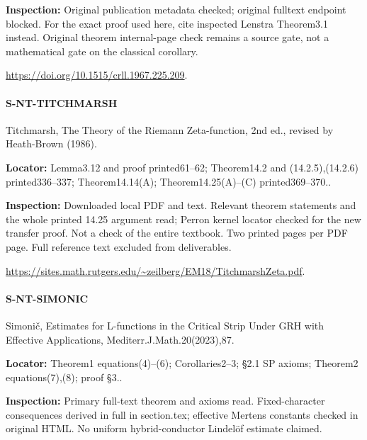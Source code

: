 \documentclass[11pt,a4paper]{article}
\begin{document}
\textbf{Inspection:} Original publication metadata checked; original fulltext endpoint blocked.\allowbreak{} For the exact proof used here, cite inspected Lenstra Theorem3.\allowbreak{}1 instead.\allowbreak{} Original theorem internal-page check remains a source gate, not a mathematical gate on the classical corollary.\allowbreak{}

\url{https://doi.org/10.1515/crll.1967.225.209}.

\paragraph{S-NT-TITCHMARSH} Titchmarsh, The Theory of the Riemann Zeta-function, 2nd ed.\allowbreak{}, revised by Heath-Brown (1986).

\textbf{Locator:} Lemma3.\allowbreak{}12 and proof printed61–\allowbreak{}62; Theorem14.\allowbreak{}2 and (14.\allowbreak{}2.\allowbreak{}5),(14.\allowbreak{}2.\allowbreak{}6) printed336–\allowbreak{}337; Theorem14.\allowbreak{}14(A); Theorem14.\allowbreak{}25(A)–\allowbreak{}(C) printed369–\allowbreak{}370.\allowbreak{}.

\textbf{Inspection:} Downloaded local PDF and text.\allowbreak{} Relevant theorem statements and the whole printed 14.\allowbreak{}25 argument read; Perron kernel locator checked for the new transfer proof.\allowbreak{} Not a check of the entire textbook.\allowbreak{} Two printed pages per PDF page.\allowbreak{} Full reference text excluded from deliverables.\allowbreak{}

\url{https://sites.math.rutgers.edu/~zeilberg/EM18/TitchmarshZeta.pdf}.

\paragraph{S-NT-SIMONIC} Simonič, Estimates for L-functions in the Critical Strip Under GRH with Effective Applications, Mediterr.\allowbreak{}J.\allowbreak{}Math.\allowbreak{}20(2023),87.

\textbf{Locator:} Theorem1 equations(4)–\allowbreak{}(6); Corollaries2–\allowbreak{}3; §2.\allowbreak{}1 SP axioms; Theorem2 equations(7),(8); proof §3.\allowbreak{}.

\textbf{Inspection:} Primary full-text theorem and axioms read.\allowbreak{} Fixed-character consequences derived in full in section.\allowbreak{}tex; effective Mertens constants checked in original HTML.\allowbreak{} No uniform hybrid-conductor Lindelöf estimate claimed.\allowbreak{}
\end{document}
